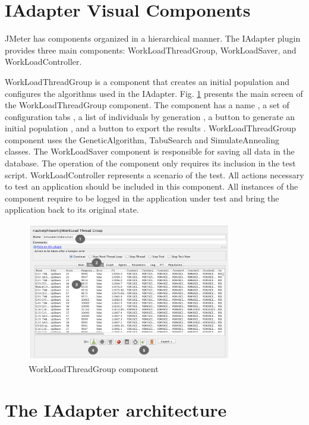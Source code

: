 \documentclass{report}
\begin{document}
\section{IAdapter Visual Components}

JMeter has components organized  in a hierarchical manner. The IAdapter plugin provides three main components: WorkLoadThreadGroup, WorkLoadSaver, and WorkLoadController.

WorkLoadThreadGroup is a component that creates an initial population and configures the algorithms used in the IAdapter. Fig. \ref{fig:tela1iadapter} presents the main screen of the WorkLoadThreadGroup component. The component has a name , a set of configuration tabs , a list of individuals by generation , a button to generate an initial population , and a button to export the results . WorkLoadThreadGroup component uses the GeneticAlgorithm, TabuSearch and SimulateAnnealing classes.  The WorkLoadSaver component is responsible for saving all data in the database. The operation of the component only requires its inclusion in the test script. WorkLoadController represents a scenario of the test. All actions necessary to test an application should be included in this component. All instances of the component require to be logged in the application under test and bring the application back to its original state.

\begin{figure}[h]
\centering
\includegraphics[width=0.8\textwidth]{./images/tela1iadapter.png}
\caption{WorkLoadThreadGroup component}
\label{fig:tela1iadapter}
\end{figure}

\vspace*{-.075in}
\section{The IAdapter architecture}
\label{sec:technique}
\vspace*{-.075in}
\end{document}
